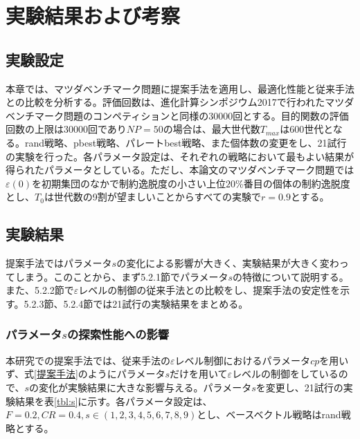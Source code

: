 \documentclass[a4paper,12pt]{jsreport}
\begin{document}
\chapter{実験結果および考察}

\section{実験設定}
本章では、マツダベンチマーク問題に提案手法を適用し、最適化性能と従来手法との比較を分析する。評価回数は、進化計算シンポジウム2017で行われたマツダベンチマーク問題のコンペティションと同様の30000回\cite{評価回数}とする。目的関数の評価回数の上限は30000回であり$NP=50$の場合は、最大世代数${T}_{max}$は600世代となる。rand戦略、pbest戦略、パレートbest戦略、また個体数の変更をし、21試行の実験を行った。各パラメータ設定は、それぞれの戦略において最もよい結果が得られたパラメータとしている。ただし、本論文のマツダベンチマーク問題では$\varepsilon(0)$を初期集団のなかで制約逸脱度の小さい上位$20$\%番目の個体の制約逸脱度とし、${T}_0$は世代数の9割が望ましい\cite{εレベル制御}\cite{先行研究}ことからすべての実験で$r=0.9$とする。

\section{実験結果}
提案手法ではパラメータ$s$の変化による影響が大きく、実験結果が大きく変わってしまう。このことから、まず5.2.1節でパラメータ$s$の特徴について説明する。また、5.2.2節で$\varepsilon$レベルの制御の従来手法との比較をし、提案手法の安定性を示す。5.2.3節、5.2.4節では21試行の実験結果をまとめる。

\subsection{パラメータ$s$の探索性能への影響}
本研究での提案手法では、従来手法の$\varepsilon$レベル制御におけるパラメータ$cp$を用いず、式\ref{提案手法}のようにパラメータ$s$だけを用いて$\varepsilon$レベルの制御をしているので、$s$の変化が実験結果に大きな影響与える。パラメータ$s$を変更し、21試行の実験結果を表\ref{tbl:s}に示す。各パラメータ設定は、$F=0.2,CR=0.4,s \in (1,2,3,4,5,6,7,8,9)$とし、ベースベクトル戦略はrand戦略とする。
\end{document}
